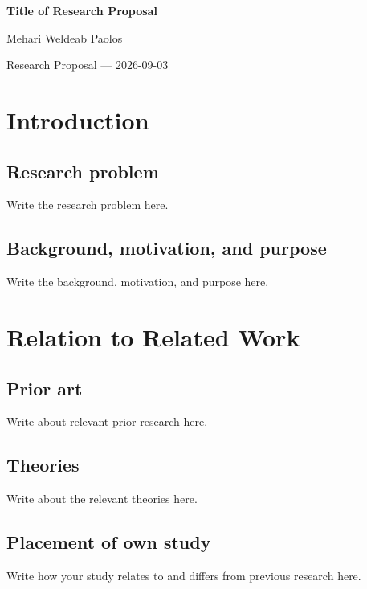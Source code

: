 \documentclass[10pt,a4paper]{article}
\begin{document}
{\centering
    {\sffamily\bfseries\LARGE Title of Research Proposal\par}
    \vspace{3pt}
    {\large Mehari Weldeab Paolos\par}
    \vspace{2pt}
    {\small Research Proposal --- 2026-09-03
    \par}
}

\vspace{8pt}

\section{Introduction}

\subsection{Research problem}

Write the research problem here.

\subsection{Background, motivation, and purpose}

Write the background, motivation, and purpose here.

\section{Relation to Related Work}

\subsection{Prior art}

Write about relevant prior research here.

\subsection{Theories}

Write about the relevant theories here.

\subsection{Placement of own study}

Write how your study relates to and differs from previous research here.
\end{document}
